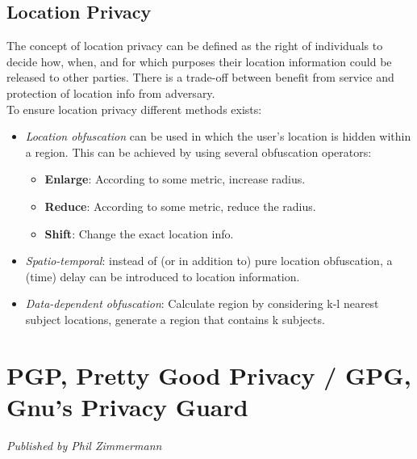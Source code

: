 \documentclass[a4paper]{article}
\begin{document}
\subsection{Location Privacy}
The concept of location privacy can be defined as the right of individuals to decide how, when, and for which purposes their location information could be released to other parties. There is a trade-off between benefit from service and protection of location info from adversary.\\
To ensure location privacy different methods exists: 
\begin{itemize}
    \item \textit{Location obfuscation} can be used in which the user's location is hidden within a region. This can be achieved by using several obfuscation operators:
\begin{itemize}[noitemsep,nolistsep]
    \item \textbf{Enlarge}: According to some metric, increase radius.
    \item \textbf{Reduce}: According to some metric, reduce the radius.
    \item \textbf{Shift}: Change the exact location info.
\end{itemize}
\item \textit{Spatio-temporal}: instead of (or in addition to) pure location obfuscation, a (time) delay can be introduced to location information.
\item \textit{Data-dependent obfuscation}: Calculate region by considering k-l nearest subject locations, generate a region that contains k subjects.
\end{itemize} 

\newpage
\section{PGP, Pretty Good Privacy / GPG, Gnu's Privacy Guard}
\begin{center}
    \textit{Published by Phil Zimmermann}
\end{center}
\end{document}
